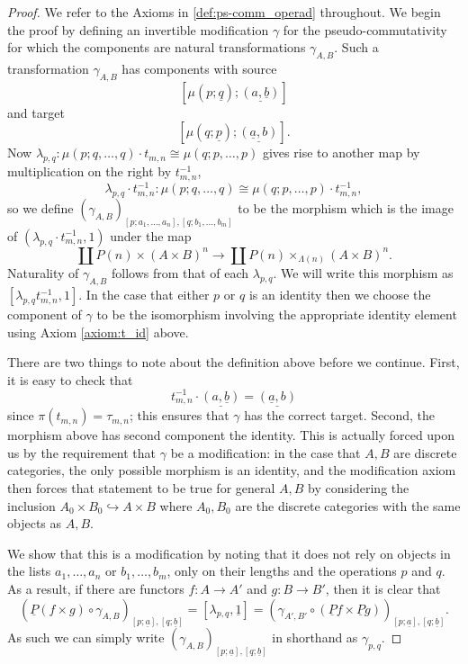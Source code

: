 \begin{proof}
We refer to the Axioms in \cref{def:ps-comm_operad} throughout. We begin the proof by defining an invertible modification $\gamma$ for the pseudo-commutativity for which the components are natural transformations $\gamma_{A,B}$. Such a transformation $\gamma_{A,B}$ has components with source
  \[
    \left[\mu\left(p; \underline{q}\right); \underline{(a, \underline{b})}\right]
  \]
and target
  \[
    \left[\mu\left(q; \underline{p}\right); \underline{(\underline{a},b)}\right].
  \]
Now $ \lambda_{p,q} \colon \mu(p;q,\ldots,q) \cdot t_{m,n} \cong \mu(q;p,\ldots,p)$ gives rise to another map by multiplication on the right by $t_{m,n}^{-1}$,
  \[
    \lambda_{p,q}\cdot t_{m,n}^{-1} \colon \mu(p;q,\ldots,q) \cong \mu(q;p,\ldots,p) \cdot t_{m,n}^{-1},
  \]
so we define $(\gamma_{A,B})_{[p;a_1,\ldots,a_n],[q;b_1,\ldots,b_m]}$ to be the morphism which is the image of $(\lambda_{p,q}\cdot t_{m,n}^{-1}, 1)$ under the map
  \[
    \coprod P(n) \times (A \times B)^{n} \rightarrow \coprod P(n) \times_{\Lambda(n)} (A \times B)^{n}.
  \]
Naturality of $\gamma_{A,B}$ follows from that of each $\lambda_{p,q}$. We will write this morphism as $[\lambda_{p,q}t_{m,n}^{-1}, 1]$. In the case that either $p$ or $q$ is an identity then we choose the component of $\gamma$ to be the isomorphism involving the appropriate identity element using Axiom \ref{axiom:t_id} above.

There are two things to note about the definition above before we continue. First, it is easy to check that
  \[
    t_{m,n}^{-1} \cdot \underline{\left(a, \underline{b}\right)} = \underline{\left(\underline{a},b\right)}
  \]
since $\pi(t_{m,n}) = \tau_{m,n}$; this ensures that $\gamma$ has the correct target. Second, the morphism above has second component the identity. This is actually forced upon us by the requirement that $\gamma$ be a modification:  in the case that $A,B$ are discrete categories, the only possible morphism is an identity, and the modification axiom then forces that statement to be true for general $A,B$ by considering the inclusion $A_{0} \times B_{0} \hookrightarrow A \times B$ where $A_{0}, B_{0}$ are the discrete categories with the same objects as $A, B$.

We show that this is a modification by noting that it does not rely on objects in the lists $a_1, \ldots, a_n$ or $b_1, \ldots, b_m$, only on their lengths and the operations $p$ and $q$. As a result, if there are functors $f \colon A \rightarrow A'$ and $g \colon B \rightarrow B'$, then it is clear that
    \[
        (\underline{P}(f\times g) \circ \gamma_{A,B})_{\left[p;\underline{a}\right],\left[q;\underline{b}\right]} = [\lambda_{p,q},\underline{1}] = (\gamma_{A',B'} \circ (\underline{P}f\times \underline{P}g))_{\left[p;\underline{a}\right],\left[q;\underline{b}\right]}.
    \]
As such we can simply write $(\gamma_{A,B})_{[p;\underline{a}],[q;\underline{b}]}$ in shorthand as $\gamma_{p,q}$.


\end{proof}
